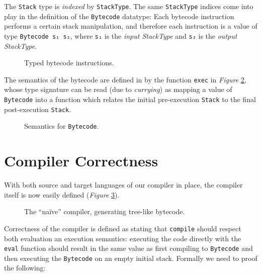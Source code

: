 \documentclass[a4paper]{article}
\newcommand{\fref}[1]{\emph{Figure} \ref{lst:#1}}
\begin{document}
        The \texttt{Stack} type is \emph{indexed} by \texttt{StackType}.
        The same \texttt{StackType} indices come into play in the definition of the \texttt{Bytecode} datatype:
        Each bytecode instruction performs a certain stack manipulation,
        and therefore each instruction is a value of type \texttt{Bytecode s₁ s₂},
        where \texttt{s₁} is the \emph{input StackType} and \texttt{s₂} is the \emph{output StackType}.

        \begin{figure}[h!]
            \caption{Typed bytecode instructions.
                \label{lst:bytecode}
            }
        \end{figure}

        The semantics of the bytecode are defined in by the function \texttt{exec} in \fref{exec}, whose type 
        signature can be read (due to \emph{currying}) as mapping a value of \texttt{Bytecode}
        into a function which relates the initial pre-execution \texttt{Stack} to the final post-execution \texttt{Stack}.

        \begin{figure}[h!]
            \caption{Semantics for \texttt{Bytecode}.
                \label{lst:exec}
            }
        \end{figure}

        
    \section{Compiler Correctness}
    \label{sec:correctness}
        
        With both source and target languages of our compiler in place, the compiler itself is now easily defined (\fref{compile}).

        \begin{figure}[h!]
            \caption{The ``naïve'' compiler, generating tree-like bytecode.
                \label{lst:compile}
            }
        \end{figure}

        Correctness of the compiler is defined as stating that \texttt{compile} should respect both evaluation an execution semantics: executing
        the code directly with the \texttt{eval} function should result in the same value as first compiling to \texttt{Bytecode} and
        then executing the \texttt{Bytecode} on an empty initial stack. Formally we need to proof the following:
        
\end{document}
